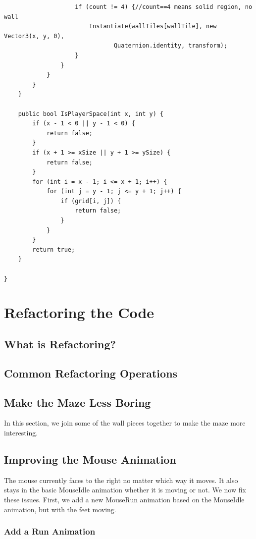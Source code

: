 \documentclass[12pt]{amsbook}
\theoremstyle{definition}
\theoremstyle{remark}
\numberwithin{figure}{chapter}
\numberwithin{table}{chapter}
\numberwithin{section}{chapter}
\numberwithin{equation}{section}
\begin{document}
\begin{verbatim}
                    if (count != 4) {//count==4 means solid region, no wall
                        Instantiate(wallTiles[wallTile], new Vector3(x, y, 0),
                               Quaternion.identity, transform);
                    }
                }
            }
        }
    }

    public bool IsPlayerSpace(int x, int y) {
        if (x - 1 < 0 || y - 1 < 0) {
            return false;
        }
        if (x + 1 >= xSize || y + 1 >= ySize) {
            return false;
        }
        for (int i = x - 1; i <= x + 1; i++) {
            for (int j = y - 1; j <= y + 1; j++) {
                if (grid[i, j]) {
                    return false;
                }
            }
        }
        return true;
    }

}
\end{verbatim}

\chapter{Refactoring the Code}

\section{What is Refactoring?}

\section{Common Refactoring Operations}

\section{Make the Maze Less Boring}

In this section, we join some of the wall pieces together to make the maze more interesting.

\section{Improving the Mouse Animation}
The mouse currently faces to the right no matter which way it moves.  It also stays in the basic MouseIdle animation whether it is moving or not.  We now fix these issues.  First, we add a new MouseRun animation based on the MouseIdle animation, but with the feet moving.  

\subsection{Add a Run Animation}
\end{document}
